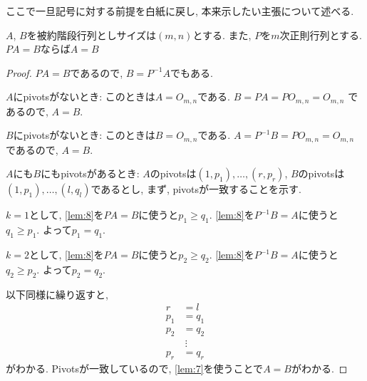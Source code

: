 ここで一旦記号に対する前提を白紙に戻し,
本来示したい主張について述べる.
\begin{theorem}
  $A$, $B$を被約階段行列としサイズは$(m,n)$とする.
  また, $P$を$m$次正則行列とする.
  $PA=B$ならば$A=B$
\end{theorem}
\begin{proof}
  $PA=B$であるので, $B=P^{-1}A$でもある.
  
  $A$にpivotsがないとき:
  このときは$A=O_{m,n}$である.
  $B=PA=PO_{m,n}=O_{m,n}$
  であるので, $A=B$.

  $B$にpivotsがないとき:
  このときは$B=O_{m,n}$である.
  $A=P^{-1}B=PO_{m,n}=O_{m,n}$
  であるので, $A=B$.

  $A$にも$B$にもpivotsがあるとき:
  $A$のpivotsは$(1,p_1),\ldots,(r,p_r)$,
  $B$のpivotsは$(1,p_1),\ldots,(l,q_l)$であるとし,
  まず, pivotsが一致することを示す.
  
  $k=1$として,
  \cref{lem:8}を$PA=B$に使うと$p_1\geq q_1$.
  \cref{lem:8}を$P^{-1}B=A$に使うと$q_1\geq p_1$.
  よって$p_1=q_1$.

  $k=2$として,
  \cref{lem:8}を$PA=B$に使うと$p_2\geq q_2$.
  \cref{lem:8}を$P^{-1}B=A$に使うと$q_2\geq p_2$.
  よって$p_2=q_2$.

  以下同様に繰り返すと,
  \begin{align*}
    r&=l\\
    p_1&=q_1\\
    p_2&=q_2\\
    &\ \vdots\\
    p_r&=q_r
  \end{align*}
  がわかる.
  Pivotsが一致しているので,
  \cref{lem:7}を使うことで$A=B$がわかる.
\end{proof}
